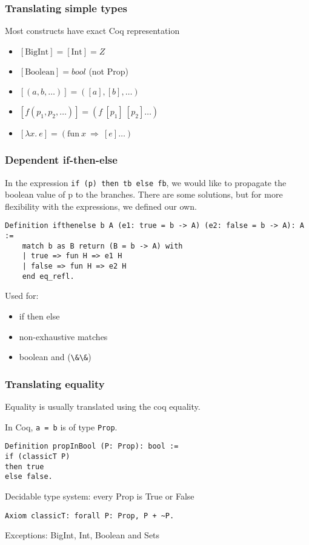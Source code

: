 \documentclass{beamer}
\newcommand{\tr}[1]{[#1]}
\newcommand{\scalaInline}[1]{\lstinline[style=myScalastyle]|#1|}
\newcommand{\coqInline}[1]{\lstinline[style=myCoqStyle]|#1|}
\begin{document}
\begin{frame}
	\frametitle{Translating simple types}
	
	Most constructs have exact Coq representation
	
	\begin{itemize}
		\item $\tr{\text{BigInt}} = \tr{\text{Int}} = Z$
		
		\item $\tr{\text{Boolean}} =  bool$ (not Prop)
		
		\item $\tr{(a,b,\ldots)} = (\tr{a},\tr{b},\ldots)$
		
		\item $\tr{f(p_1,p_2,\ldots)} = (f ~ \tr{p_1} ~  \tr{p_2} \ldots)$
		
		\item $\tr{\lambda x. ~ e} = (\text{fun} ~ x ~ \Longrightarrow ~ \tr{e} \ldots)$
	\end{itemize}
	 
\end{frame}

\begin{frame}[fragile]
	\frametitle{Dependent if-then-else}
	
	In the expression \scalaInline{if (p) then tb else fb}, we would like to propagate the boolean value of p to the branches.
	There are some solutions, but for more flexibility with the expressions, we defined our own.
	
	\begin{lstlisting}[style=myCoqstyle]
	Definition ifthenelse b A (e1: true = b -> A) (e2: false = b -> A): A :=
	match b as B return (B = b -> A) with
	| true => fun H => e1 H
	| false => fun H => e2 H
	end eq_refl.
	\end{lstlisting}
	Used for:
	\begin{itemize}
		\item if then else
		\item non-exhaustive matches
		\item boolean and (\scalaInline{\&\&})
	\end{itemize}
	
	
\end{frame}

\begin{frame}[fragile]
	\frametitle{Translating equality}
	Equality is usually translated using the coq equality.
	
		In Coq, \coqInline{a = b} is of type \coqInline{Prop}.
	
\begin{lstlisting}[style=myCoqstyle]
Definition propInBool (P: Prop): bool :=
if (classicT P)
then true
else false.
\end{lstlisting}

Decidable type system: every Prop is True or False

\begin{lstlisting}[style=myCoqstyle]
Axiom classicT: forall P: Prop, P + ~P.
\end{lstlisting}

 {
	Exceptions: BigInt, Int, Boolean and Sets
}

\end{frame}
\end{document}
